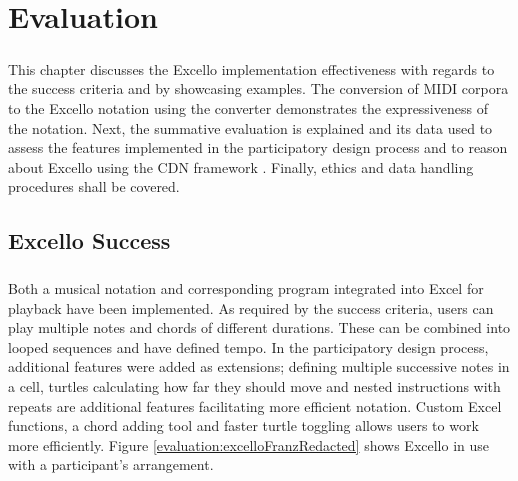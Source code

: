 

\newcommand{\mycbox}[1]{\tikz{\path[draw=#1,fill=#1] (0,0) rectangle (0.3cm,0.3cm);}}

\chapter{Evaluation}

\paragraph{} This chapter discusses the Excello implementation effectiveness with regards to the success criteria and by showcasing examples. The conversion of MIDI corpora to the Excello notation using the converter demonstrates the expressiveness of the notation. Next, the summative evaluation is explained and its data used to assess the features implemented in the participatory design process and to reason about Excello using the CDN framework \cite{blackwell:tutorial}. Finally, ethics and data handling procedures shall be covered.

\section{Excello Success}

\paragraph{} Both a musical notation and corresponding program integrated into Excel for playback have been implemented. As required by the success criteria, users can play multiple notes and chords of different durations. These can be combined into looped sequences and have defined tempo. In the participatory design process, additional features were added as extensions; defining multiple successive notes in a cell, turtles calculating how far they should move and nested instructions with repeats are additional features facilitating more efficient notation. Custom Excel functions, a chord adding tool and faster turtle toggling allows users to work more efficiently. Figure \ref{evaluation:excelloFranzRedacted} shows Excello in use with a participant's arrangement.

